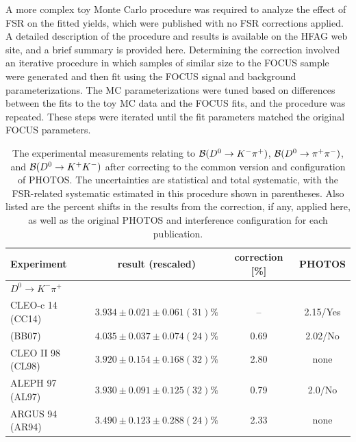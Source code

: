 A more complex toy Monte Carlo procedure was required to analyze 
the effect of FSR on the fitted yields, which were published with 
no FSR corrections applied.  A detailed description of the procedure 
and results is available on the HFAG web site, 
and a brief summary is provided
here.  Determining the correction involved an iterative procedure in which samples of similar size to the FOCUS sample were 
generated and then fit using the FOCUS signal and background 
parameterizations.  The MC parameterizations were tuned based 
on differences between the fits to the toy MC data and the FOCUS 
fits, and the procedure was repeated. These steps were iterated until 
the fit parameters matched the original FOCUS parameters.  

\begin{table}
  \centering 
  \caption{The experimental measurements relating to ${\cal B}(D^0\to K^-\pi^+)$, ${\cal B}(D^0\to \pi^+\pi^-)$, and ${\cal B}(D^0\to K^+ K^-)$ after correcting to the common version and configuration of PHOTOS.  The uncertainties are statistical and total systematic, with the FSR-related systematic estimated in this procedure shown in parentheses.  Also listed are the percent shifts in the results from the correction, if any, applied here, as well as the original PHOTOS and interference configuration for each publication.}
  \label{tab:FSR_corrections}
\begin{tabular}{lccc}
\hline \hline
Experiment & result (rescaled) & correction [\%] & PHOTOS \\ \hline
\multicolumn{4}{l}{$D^{0} \to K^{-} \pi^{+}$} \\
      CLEO-c 14  (CC14) \cite{Bonvicini:2013vxi} & $3.934 \pm 0.021 \pm 0.061(31)\%$ & --   & 2.15/Yes \\
      \babar 07  (BB07) \cite{Aubert:2007wn}   & $4.035 \pm 0.037 \pm 0.074(24)\%$ & 0.69 & 2.02/No \\
      CLEO II 98 (CL98) \cite{Artuso:1997mc}   & $3.920 \pm 0.154 \pm 0.168(32)\%$ & 2.80 & none \\
      ALEPH 97   (AL97) \cite{Barate:1997mm}   & $3.930 \pm 0.091 \pm 0.125(32)\%$ & 0.79 & 2.0/No \\
      ARGUS 94   (AR94) \cite{Albrecht:1994nb} & $3.490 \pm 0.123 \pm 0.288(24)\%$ & 2.33 & none \\

\end{tabular}
\end{table}

